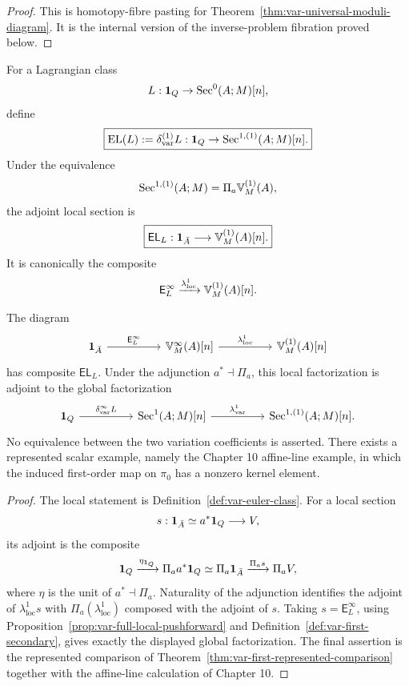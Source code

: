 \begin{proof}
This is homotopy-fibre pasting for Theorem~\ref{thm:var-universal-moduli-diagram}. It is the internal version of the inverse-problem fibration proved below.
\end{proof}

\begin{definition}
\label{def:var-euler-class}
For a Lagrangian class
\[
    L:\mathbf 1_Q\to\operatorname{Sec}^0(A;M)[n],
\]
define
\[
    \boxed{
    \operatorname{EL}(L)
    :=
    \delta^{(1)}_{\mathrm{var}}L:
    \mathbf 1_Q\to\operatorname{Sec}^{1,(1)}(A;M)[n].
    }
\]
Under the equivalence
\[
    \operatorname{Sec}^{1,(1)}(A;M)=\Pi_a\mathbb V^{(1)}_M(A),
\]
the adjoint local section is
\[
    \boxed{
    \mathsf{EL}_L:
    \mathbf 1_{\bar A}\longrightarrow\mathbb V^{(1)}_M(A)[n].
    }
\]
It is canonically the composite
\[
    \mathsf E_L^{\infty}
    \xrightarrow{\lambda^1_{\mathrm{loc}}}
    \mathbb V^{(1)}_M(A)[n].
\]
\end{definition}

\begin{proposition}
\label{prop:var-full-vs-first}
The diagram
\[
\begin{tikzcd}[column sep=huge]
\one_{\bar A}
  \arrow[r,"\mathsf E_L^{\infty}"]
& \Vfull_M(A)[n]
  \arrow[r,"\lambda^1_{\mathrm{loc}}"]
& \Vfirst_M(A)[n]
\end{tikzcd}
\]
has composite \(\mathsf{EL}_L\). Under the adjunction \(a^*\dashv\Pi_a\), this local factorization is adjoint to the global factorization
\[
\begin{tikzcd}[column sep=huge]
\one_Q
  \arrow[r,"\delta^{\infty}_{\mathrm{var}}L"]
& \Sec^1(A;M)[n]
  \arrow[r,"\lambda^1_{\mathrm{var}}"]
& \Sec^{1,(1)}(A;M)[n].
\end{tikzcd}
\]
No equivalence between the two variation coefficients is asserted. There exists a represented scalar example, namely the Chapter 10 affine-line example, in which the induced first-order map on \(\pi_0\) has a nonzero kernel element.
\end{proposition}

\begin{proof}
The local statement is Definition~\ref{def:var-euler-class}. For a local section
\[
    s:\mathbf 1_{\bar A}\simeq a^*\mathbf 1_Q\longrightarrow V,
\]
its adjoint is the composite
\[
    \mathbf 1_Q
    \xrightarrow{\eta_{\mathbf 1_Q}}
    \Pi_a a^*\mathbf 1_Q
    \simeq
    \Pi_a\mathbf 1_{\bar A}
    \xrightarrow{\Pi_as}
    \Pi_aV,
\]
where \(\eta\) is the unit of \(a^*\dashv\Pi_a\). Naturality of the adjunction identifies the adjoint of \(\lambda^1_{\mathrm{loc}}s\) with \(\Pi_a(\lambda^1_{\mathrm{loc}})\) composed with the adjoint of \(s\). Taking \(s=\mathsf E_L^\infty\), using Proposition~\ref{prop:var-full-local-pushforward} and Definition~\ref{def:var-first-secondary}, gives exactly the displayed global factorization. The final assertion is the represented comparison of Theorem~\ref{thm:var-first-represented-comparison} together with the affine-line calculation of Chapter 10.
\end{proof}

